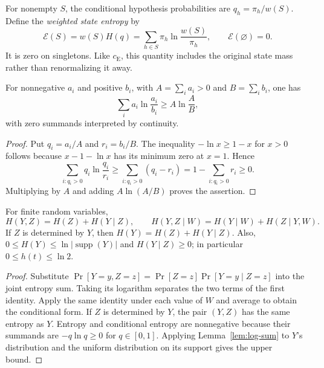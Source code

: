 For nonempty $S$, the conditional hypothesis probabilities are
$q_h=\pi_h/w(S)$. Define the \emph{weighted state entropy} by
\[
 \mathcal E(S)=w(S)H(q)
       =\sum_{h\in S}\pi_h\ln\frac{w(S)}{\pi_h},
 \qquad \mathcal E(\varnothing)=0.
\]
It is zero on singletons. Like $c_{\mathrm E}$, this quantity
includes the original state mass rather than renormalizing it away.

\begin{lemma}\label{lem:log-sum}
For nonnegative $a_i$ and positive $b_i$, with
$A=\sum_i a_i>0$ and $B=\sum_i b_i$, one has
\[
 \sum_i a_i\ln\frac{a_i}{b_i}\ge A\ln\frac AB,
\]
with zero summands interpreted by continuity.
\end{lemma}
\begin{proof}
Put $q_i=a_i/A$ and $r_i=b_i/B$.
The inequality $-\ln x\ge1-x$ for $x>0$ follows because
$x-1-\ln x$ has its minimum zero at $x=1$. Hence
\[
 \sum_{i:q_i>0}q_i\ln\frac{q_i}{r_i}
 \ge\sum_{i:q_i>0}(q_i-r_i)
 =1-\sum_{i:q_i>0}r_i\ge0.
\]
Multiplying by $A$ and adding $A\ln(A/B)$ proves the assertion.
\end{proof}

\begin{lemma}\label{lem:entropy-chain-rule}
For finite random variables,
\[
 H(Y,Z)=H(Z)+H(Y\mid Z),\qquad
 H(Y,Z\mid W)=H(Y\mid W)+H(Z\mid Y,W).
\]
If $Z$ is determined by $Y$, then
$H(Y)=H(Z)+H(Y\mid Z)$. Also,
$0\le H(Y)\le\ln|\operatorname{supp}(Y)|$ and
$H(Y\mid Z)\ge0$; in particular $0\le h(t)\le\ln2$.
\end{lemma}
\begin{proof}
Substitute
$\Pr[Y=y,Z=z]=\Pr[Z=z]\Pr[Y=y\mid Z=z]$ into the joint
entropy sum. Taking its logarithm separates the two terms of the
first identity. Apply the same identity under each value of $W$
and average to obtain the conditional form. If $Z$ is determined
by $Y$, the pair $(Y,Z)$ has the same entropy as $Y$.
Entropy and conditional entropy are nonnegative because their
summands are $-q\ln q\ge0$ for $q\in[0,1]$.
Applying Lemma~\ref{lem:log-sum} to $Y$'s distribution and the
uniform distribution on its support gives the upper bound.
\end{proof}

